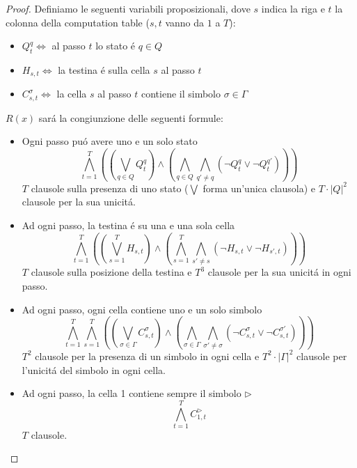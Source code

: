 \begin{proof}
Definiamo le seguenti variabili proposizionali, dove $s$ indica la riga e $t$ la colonna della computation table
($s, t$ vanno da $1$ a $T$):
\begin{itemize}
    \item $Q_t^q \iff $ al passo $t$ lo stato é $q \in Q$
    \item $H_{s,t} \iff $ la testina é sulla cella $s$ al passo $t$
    \item $C_{s,t}^\sigma \iff $ la cella $s$ al passo $t$ contiene il simbolo $\sigma \in \Gamma$
\end{itemize}
\newpage
$R(x)$ sará la congiunzione delle seguenti formule:
\begin{itemize}
    \item Ogni passo puó avere uno e un solo stato
    \[
    \bigwedge_{t=1}^{T} \left( \left( \bigvee_{q \in Q} Q_t^q \right) \land \left( \bigwedge_{q \in Q} \bigwedge_{q' \neq q} (\neg Q_t^q \lor \neg Q_t^{q'}) \right) \right)
    \]
    $T$ clausole sulla presenza di uno stato ($\bigvee$ forma un'unica clausola) e $T \cdot |Q|^2$ clausole per la sua unicitá.\\
    
    \item Ad ogni passo, la testina é su una e una sola cella
    \[
    \bigwedge_{t=1}^{T} \left( \left(\bigvee_{s=1}^{T} H_{s,t}\right) \land \left( \bigwedge_{s=1}^{T} \bigwedge_{s' \neq s} (\neg H_{s,t} \lor \neg H_{s', t}) \right) \right)
    \]
    $T$ clausole sulla posizione della testina e $T^3$ clausole per la sua unicitá in ogni passo.\\
    
    \item Ad ogni passo, ogni cella contiene uno e un solo simbolo
    \[
    \bigwedge_{t=1}^{T} \bigwedge_{s=1}^{T} \left( \left( \bigvee_{\sigma \in \Gamma} C_{s,t}^\sigma \right) \land \left( \bigwedge_{\sigma \in \Gamma} \bigwedge_{\sigma' \neq \sigma} (\neg C_{s,t}^\sigma \lor \neg C_{s,t}^{\sigma'}) \right) \right)
    \]
    $T^2$ clausole per la presenza di un simbolo in ogni cella e $T^2 \cdot |\Gamma|^2$ clausole per l'unicitá del simbolo in ogni cella.\\
    
    \item Ad ogni passo, la cella 1 contiene sempre il simbolo $\triangleright$
    \[
    \bigwedge_{t=1}^{T} C_{1,t}^{\triangleright}
    \]
    $T$ clausole.\\
    

\end{itemize}
\end{proof}
